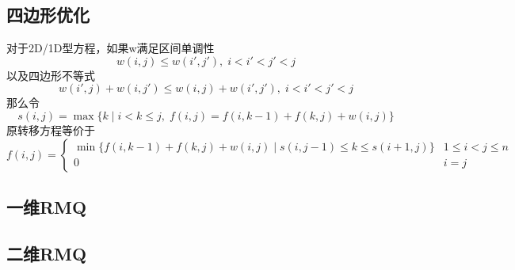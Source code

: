 \subsection{四边形优化}
对于2D/1D型方程，如果w满足区间单调性
\begin{displaymath}
	w(i,j)\leqslant w(i',j'),\;i<i'<j'<j
\end{displaymath}
以及四边形不等式
\begin{displaymath}
	w(i',j)+w(i,j')\leqslant w(i,j)+w(i',j'),\;i<i'<j'<j
\end{displaymath}
那么令
\begin{displaymath}
	s(i,j)=\max\{k\;|\;i<k\leqslant j,\;f(i,j)=f(i,k-1)+f(k,j)+w(i,j)\}	
\end{displaymath}
原转移方程等价于
\begin{displaymath}
	f(i,j)=
		\begin{cases}
			\min\{f(i,k-1)+f(k,j)+w(i,j)\;|\;s(i,j-1)\leqslant k\leqslant s(i+1,j)\} & 1\leqslant i<j\leqslant n \\
			0                                                                        & i=j
		\end{cases}
\end{displaymath}

\subsection{一维RMQ}


\subsection{二维RMQ}
